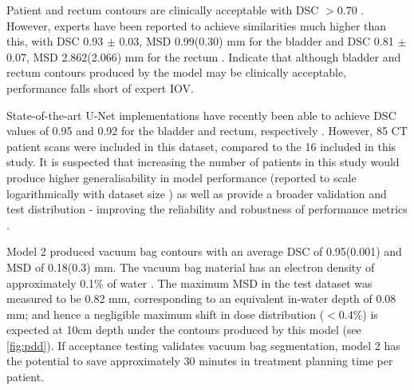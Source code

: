 Patient and rectum contours are clinically acceptable with DSC $>0.70$ \cite{Roach_2019}. However, experts have been reported to achieve similarities much higher than this, with  DSC 0.93 $\pm$ 0.03, MSD 0.99(0.30) mm for the bladder and DSC 0.81 $\pm$ 0.07, MSD 2.862(2.066) mm for the rectum \cite{Roach_2019}. Indicate that although bladder and rectum contours produced by the model may be clinically acceptable, performance falls short of expert IOV.

State-of-the-art U-Net implementations have recently been able to achieve DSC values of 0.95 and 0.92 for the bladder and rectum, respectively \cite{Kazemifar_2018}. However, 85 CT patient scans were included in this dataset, compared to the 16 included in this study. It is suspected that increasing the number of patients in this study would produce higher generalisability in model performance (reported to scale logarithmically with dataset size \cite{Nemoto_2020}) as well as provide a broader validation and test distribution - improving the reliability and robustness of performance metrics \cite{Ronneberger_2015}. 

Model 2 produced vacuum bag contours with an average DSC of 0.95(0.001) and MSD of 0.18(0.3) mm. The vacuum bag material has an electron density of approximately 0.1\% of water \cite{Park}. The maximum MSD in the test dataset was measured to be 0.82 mm, corresponding to an equivalent in-water depth of 0.08 mm; and hence a negligible maximum shift in dose distribution ($<0.4\%$) is expected at 10cm depth under the contours produced by this model (see \ref{fig:pdd}). If acceptance testing validates vacuum bag segmentation, model 2 has the potential to save approximately 30 minutes in treatment planning time per patient.






	
%
%
%



